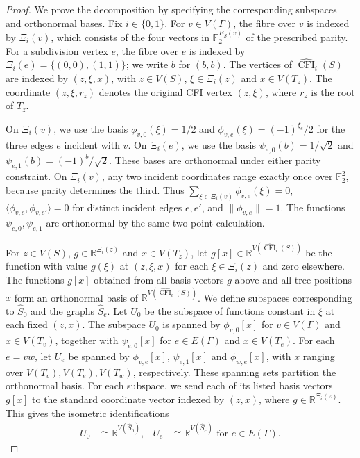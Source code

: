 \documentclass[10pt,a4paper]{article}
\theoremstyle{plain}
\theoremstyle{definition}
\DeclareMathOperator{\CFI}{CFI}
\newcommand{\R}{\mathbb{R}}
\begin{document}
\begin{proof}
We prove the decomposition by specifying the corresponding subspaces
and orthonormal bases.
Fix $i\in\{0,1\}$.
For $v\in V(\Gamma)$, the fibre over $v$ is indexed by $\Xi_i(v)$, which
consists of the four vectors in $\mathbb F_2^{E_S(v)}$ of the
prescribed parity.
For a subdivision vertex $e$, the fibre over $e$ is indexed by
$\Xi_i(e)=\{(0,0),(1,1)\}$; we write $b$ for $(b,b)$.
The vertices of $\widehat{\CFI}_i(S)$ are indexed by $(z,\xi,x)$, with $z\in V(S)$,
$\xi\in \Xi_i(z)$ and $x\in V(T_z)$.
The coordinate $(z,\xi,r_z)$ denotes the original CFI vertex $(z,\xi)$,
where $r_z$ is the root of $T_z$.

On $\Xi_i(v)$, we use the basis $\phi_{v,0}(\xi)=1/2$ and
$\phi_{v,e}(\xi)=(-1)^{\xi_e}/2$ for the three edges $e$ incident with $v$.
On $\Xi_i(e)$, we use the basis $\psi_{e,0}(b)=1/\sqrt2$ and
$\psi_{e,1}(b)=(-1)^b/\sqrt2$.
These bases are orthonormal under either parity constraint.
On $\Xi_i(v)$, any two incident coordinates range exactly once over
$\mathbb F_2^2$, because parity determines the third.
Thus $\sum_{\xi\in \Xi_i(v)}\phi_{v,e}(\xi)=0$,
$\langle\phi_{v,e},\phi_{v,e'}\rangle=0$ for distinct incident edges $e,e'$,
and $\lVert\phi_{v,e}\rVert=1$.
The functions $\psi_{e,0},\psi_{e,1}$ are orthonormal by the same two-point
calculation.

For $z\in V(S)$, $g\in\R^{\Xi_i(z)}$ and $x\in V(T_z)$,
let $g[x]\in\R^{V(\widehat{\CFI}_i(S))}$ be the function with value $g(\xi)$ at
$(z,\xi,x)$ for each $\xi\in \Xi_i(z)$ and zero elsewhere.
The functions $g[x]$ obtained from all basis vectors $g$ above and all
tree positions $x$ form an orthonormal basis of $\R^{V(\widehat{\CFI}_i(S))}$.
We define subspaces corresponding to $\widehat S_0$
and the graphs $\widehat S_e$.
Let $U_0$ be the subspace of functions constant in $\xi$ at each fixed $(z,x)$.
The subspace $U_0$ is spanned by $\phi_{v,0}[x]$ for $v\in V(\Gamma)$
and $x\in V(T_v)$, together with $\psi_{e,0}[x]$ for $e\in E(\Gamma)$
and $x\in V(T_e)$.
For each $e=vw$, let $U_e$ be spanned by $\phi_{v,e}[x]$, $\psi_{e,1}[x]$
and $\phi_{w,e}[x]$, with $x$ ranging over $V(T_v),V(T_e),V(T_w)$,
respectively.
These spanning sets partition the orthonormal basis.
For each subspace, we send each of its listed basis vectors $g[x]$ to the standard coordinate vector indexed
by $(z,x)$, where $g\in\R^{\Xi_i(z)}$.
This gives the isometric identifications
\begin{equation}\label{eq:ss-cfi-subspaces}
 \begin{aligned}
 U_0&\cong\R^{V(\widehat S_0)}, &
 U_e&\cong\R^{V(\widehat S_e)}\text{ for }e\in E(\Gamma).
 \end{aligned}
\end{equation}


\end{proof}
\end{document}
